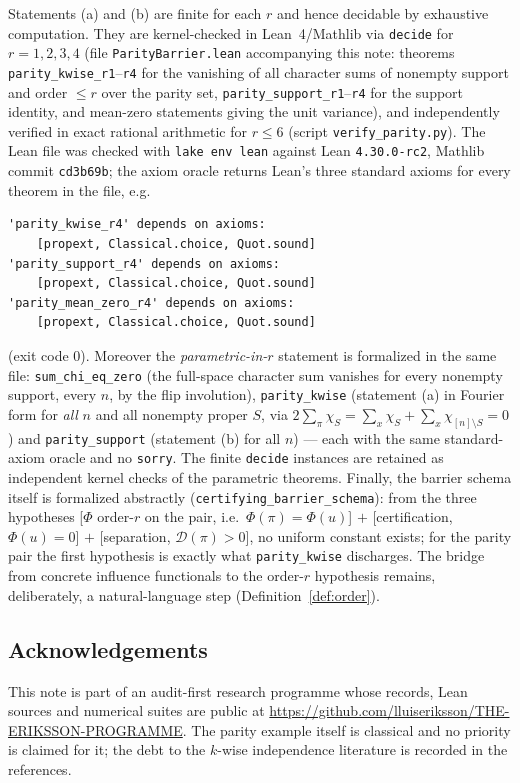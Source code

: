 \documentclass[11pt]{article}
\theoremstyle{remark}
\begin{document}
Statements (a) and (b) are finite for each $r$ and hence decidable by
exhaustive computation. They are kernel-checked in Lean~4/Mathlib via
\texttt{decide} for $r = 1, 2, 3, 4$ (file
\texttt{ParityBarrier.lean} accompanying this note: theorems
\texttt{parity\_kwise\_r1}--\texttt{r4} for the vanishing of all
character sums of nonempty support and order $\le r$ over the parity
set, \texttt{parity\_support\_r1}--\texttt{r4} for the support
identity, and mean-zero statements giving the unit variance), and
independently verified in exact rational arithmetic for $r \le 6$
(script \texttt{verify\_parity.py}). The Lean file was checked with
\texttt{lake env lean} against Lean \texttt{4.30.0-rc2}, Mathlib
commit \texttt{cd3b69b}; the axiom oracle returns Lean's three
standard axioms for every theorem in the file, e.g.
\begin{verbatim}
'parity_kwise_r4' depends on axioms:
    [propext, Classical.choice, Quot.sound]
'parity_support_r4' depends on axioms:
    [propext, Classical.choice, Quot.sound]
'parity_mean_zero_r4' depends on axioms:
    [propext, Classical.choice, Quot.sound]
\end{verbatim}
(exit code 0). Moreover the \emph{parametric-in-$r$} statement is
formalized in the same file: \texttt{sum\_chi\_eq\_zero} (the
full-space character sum vanishes for every nonempty support, every
$n$, by the flip involution), \texttt{parity\_kwise} (statement (a)
in Fourier form for \emph{all} $n$ and all nonempty proper $S$, via
$2\sum_{\pi}\chi_S = \sum_x \chi_S + \sum_x
\chi_{[n]\setminus S} = 0$) and \texttt{parity\_support}
(statement (b) for all $n$) --- each with the same standard-axiom
oracle and no \texttt{sorry}. The finite \texttt{decide} instances
are retained as independent kernel checks of the parametric theorems.
Finally, the barrier schema itself is formalized abstractly
(\texttt{certifying\_barrier\_schema}): from the three hypotheses
[$\Phi$ order-$r$ on the pair, i.e.\ $\Phi(\pi) = \Phi(u)$] $+$
[certification, $\Phi(u)=0$] $+$ [separation, $\mathcal D(\pi)>0$],
no uniform constant exists; for the parity pair the first hypothesis
is exactly what \texttt{parity\_kwise} discharges. The bridge from
concrete influence functionals to the order-$r$ hypothesis remains,
deliberately, a natural-language step (Definition~\ref{def:order}).

\subsection*{Acknowledgements}
This note is part of an audit-first research programme whose records,
Lean sources and numerical suites are public at
\url{https://github.com/lluiseriksson/THE-ERIKSSON-PROGRAMME}. The
parity example itself is classical and no priority is claimed for it;
the debt to the $k$-wise independence literature is recorded in the
references.
\end{document}
